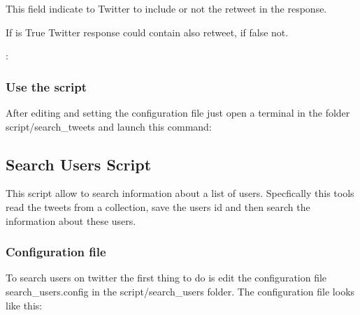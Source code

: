 \documentclass[letterpaper,10pt,english]{sphinxmanual}
\begin{document}
\begin{DUlineblock}{0em}
\item[] This field indicate to Twitter to include or not the retweet in the response.
\item[] If is True Twitter response could contain also retweet, if false not.
\end{DUlineblock}

\sphinxAtStartPar
{}: 


\subsubsection{Use the script}
\label{\detokenize{guide/tweet_search_guide:use-the-script}}
\sphinxAtStartPar
After editing and setting the configuration file just open a terminal in the folder script/search\_tweets and launch this command:

\begin{sphinxVerbatim}[commandchars=\\\{\}]
 
\end{sphinxVerbatim}


\subsection{Search Users Script}
\label{\detokenize{guide/user_search_guide:search-users-script}}\label{\detokenize{guide/user_search_guide::doc}}
\sphinxAtStartPar
This script allow to search information about a list of users. Specfically this tools read the tweets from a collection, save the users id  and then
search the information about these users.


\subsubsection{Configuration file}
\label{\detokenize{guide/user_search_guide:configuration-file}}
\sphinxAtStartPar
To search users on twitter the first thing to do is edit
the configuration file search\_users.config in the script/search\_users folder.
The configuration file looks like this:
\end{document}
